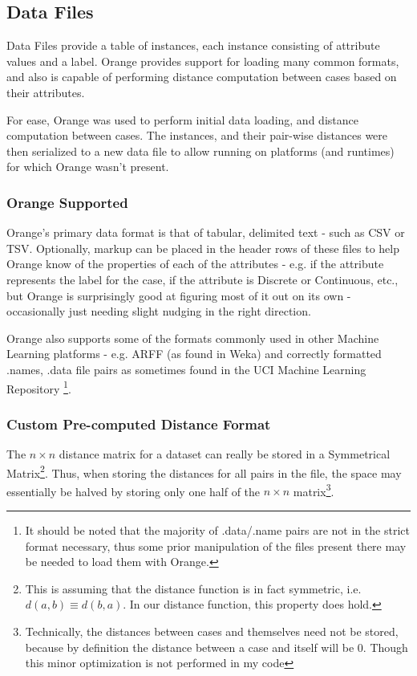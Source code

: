 \documentclass[a4paper,11pt]{report}
\begin{document}
\subsection{Data Files}
Data Files provide a table of instances, each instance consisting of attribute values and a label. Orange provides support for loading many common formats, and also is capable of performing distance computation between cases based on their attributes.

For ease, Orange was used to perform initial data loading, and distance computation between cases. The instances, and their pair-wise distances were then serialized to a new data file to allow running on platforms (and runtimes) for which Orange wasn't present.

\subsubsection{Orange Supported}
Orange's primary data format is that of tabular, delimited text - such as CSV or TSV. Optionally, markup can be placed in the header rows of these files to help Orange know of the properties of each of the attributes - e.g. if the attribute represents the label for the case, if the attribute is Discrete or Continuous, etc., but Orange is surprisingly good at figuring most of it out on its own - occasionally just needing slight nudging in the right direction.

Orange also supports some of the formats commonly used in other Machine Learning platforms - e.g. ARFF (as found in Weka) and correctly formatted .names, .data file pairs as sometimes found in the UCI Machine Learning Repository \citep{web:uci}\footnote{It should be noted that the majority of .data/.name pairs are not in the strict format necessary, thus some prior manipulation of the files present there may be needed to load them with Orange.}.

\subsubsection{Custom Pre-computed Distance Format}

The $n \times n$ distance matrix for a dataset can really be stored in a Symmetrical Matrix\footnote{This is assuming that the distance function is in fact symmetric, i.e. $d(a, b)\equiv d(b, a)$. In our distance function, this property does hold.}. Thus, when storing the distances for all pairs in the file, the space may essentially be halved by storing only one half of the $n \times n$ matrix\footnote{Technically, the distances between cases and themselves need not be stored, because by definition the distance between a case and itself will be 0. Though this minor optimization is not performed in my code}.
\end{document}
